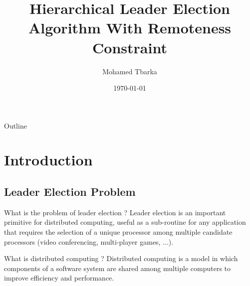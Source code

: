 \documentclass{beamer}
\title{Hierarchical Leader Election Algorithm With Remoteness Constraint}
\author{Mohamed Tbarka}
\date{\today}
\begin{document}

\frame{\titlepage}

\section[Outline]{}
\begingroup
\tiny
\begin{frame}{Outline}

  \tableofcontents
\end{frame}
\endgroup
\section{Introduction}
\subsection{Leader Election Problem}
\begin{frame}{What is the problem of leader election ?}
Leader election is an important primitive for distributed computing, useful as a sub-routine for any application that requires the selection of a unique processor among multiple candidate processors (video conferencing, multi-player games, ...).
\end{frame}

\begin{frame}{What is distributed computing ?}
Distributed computing is a model in which components of a software system are shared among multiple computers to improve efficiency and performance.
\end{frame}
\end{document}

